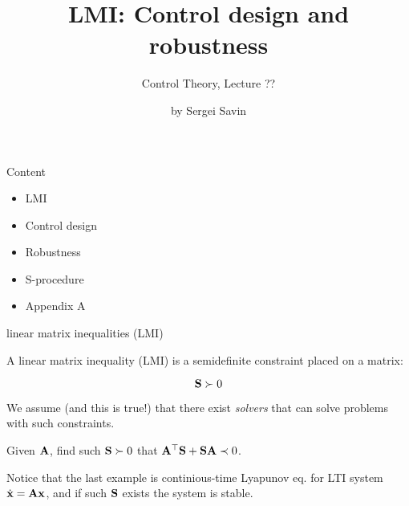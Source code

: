 \documentclass{beamer}
\title{LMI: Control design and robustness}
\subtitle{Control Theory, Lecture ??}
\author{by Sergei Savin}
\date{\mydate}
\begin{document}
	\maketitle
	
	
	
	\begin{frame}{Content}
		\begin{itemize}
			\item LMI
			\item Control design
			\item Robustness
			\item S-procedure
			\item Appendix A
		\end{itemize}
	\end{frame}
	
	
	
	
	\begin{frame}{linear matrix inequalities (LMI)}
		\begin{flushleft}
			
			A linear matrix inequality (LMI) is a semidefinite constraint placed on a matrix:
			
			\begin{equation}
				\mathbf{S} \succ 0
			\end{equation}
			
			We assume (and this is true!) that there exist \emph{solvers} that can solve problems with such constraints. 
			
			
			\begin{example}
				Given $\mathbf{A}$, find such $\mathbf{S}\succ 0$ that $\mathbf{A}^\top\mathbf{S} + \mathbf{S}\mathbf{A} \prec 0$.
			\end{example}
			
			Notice that the last example is continious-time Lyapunov eq. for LTI system $\dot{\mathbf{x}} = \mathbf{A}\mathbf{x}$, and if such $\mathbf{S}$ exists the system is stable. 
			
		\end{flushleft}
	\end{frame}
	
	
	
\end{document}
